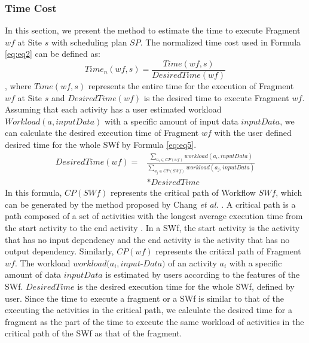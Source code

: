 \subsubsection{Time Cost}
\label{subsubsec:TC}

In this section, we present the method to estimate the time to execute Fragment $wf$ at Site $s$ with scheduling plan $SP$. The normalized time cost used in Formula \ref{eq:eq2} can be defined as:
\begin{equation}\label{eq:eq3}
\boxed{
Time_n( wf,s ) = \frac{Time( wf,s )}{DesiredTime( wf )}
}
\end{equation}
, where $Time( wf,s )$ represents the entire time for the execution of Fragment $wf$ at Site $s$ and $DesiredTime( wf )$ is the desired time to execute Fragment $wf$. Assuming that each activity has a user estimated workload $Workload(a, inputData)$ with a specific amount of input data $inputData$, we can calculate the desired execution time of Fragment $wf$ with the user defined desired time for the whole SWf by Formula \ref{eq:eq5}.
\begin{equation}\label{eq:eq5}
\boxed{
\begin{split}
DesiredTime( wf ) = &\frac{\sum_{a_i \in CP(wf)}workload(a_i, inputData)}{\sum_{a_j \in CP(SWf)}workload(a_j, inputData)} \\&* DesiredTime
\end{split}
}
\end{equation}
In this formula, $CP(SWf)$ represents the critical path of Workflow $SWf$, which can be generated by the method proposed by Chang \textit{et al.} \cite{Chang2002}. A critical path is a path composed of a set of activities with the longest average execution time from the start activity to the end activity \cite{Chang2002}. In a SWf, the start activity is the activity that has no input dependency and the end activity is the activity that has no output dependency. Similarly, $CP(wf)$ represents the critical path of Fragment $wf$. The workload $workload(a_i, input$-$Data)$ of an activity $a_i$ with a specific amount of data $inputData$ is estimated by users according to the features of the SWf. $DesiredTime$ is the desired execution time for the whole SWf, defined by user. Since the time to execute a fragment or a SWf is similar to that of the executing the activities in the critical path, we calculate the desired time for a fragment as the part of the time to execute the same workload of activities in the critical path of the SWf as that of the fragment.

